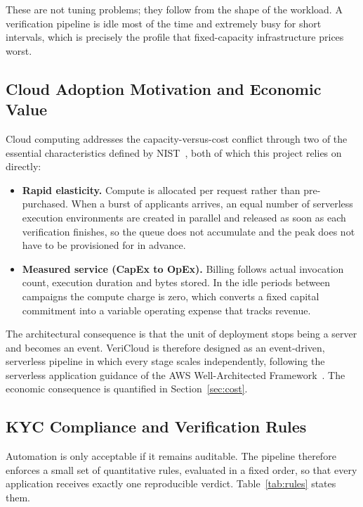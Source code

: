 These are not tuning problems; they follow from the shape of the workload. A
verification pipeline is idle most of the time and extremely busy for short
intervals, which is precisely the profile that fixed-capacity infrastructure
prices worst.

\subsection{Cloud Adoption Motivation and Economic Value}\label{sec:business:cloud}

Cloud computing addresses the capacity-versus-cost conflict through two of the
essential characteristics defined by NIST~\cite{mell2011nist}, both of which this
project relies on directly:

\begin{itemize}
  \item \textbf{Rapid elasticity.} Compute is allocated per request rather than
        pre-purchased. When a burst of applicants arrives, an equal number of
        serverless execution environments are created in parallel and released
        as soon as each verification finishes, so the queue does not accumulate
        and the peak does not have to be provisioned for in advance.
  \item \textbf{Measured service (CapEx to OpEx).} Billing follows actual
        invocation count, execution duration and bytes stored. In the idle
        periods between campaigns the compute charge is zero, which converts a
        fixed capital commitment into a variable operating expense that tracks
        revenue.
\end{itemize}

The architectural consequence is that the unit of deployment stops being a
server and becomes an event. VeriCloud is therefore designed as an event-driven,
serverless pipeline in which every stage scales independently, following the
serverless application guidance of the AWS Well-Architected
Framework~\cite{aws2022serverlesslens}. The economic consequence is quantified in
Section~\ref{sec:cost}.

\subsection{KYC Compliance and Verification Rules}\label{sec:business:rules}

Automation is only acceptable if it remains auditable. The pipeline therefore
enforces a small set of quantitative rules, evaluated in a fixed order, so that
every application receives exactly one reproducible verdict. Table~\ref{tab:rules}
states them.

